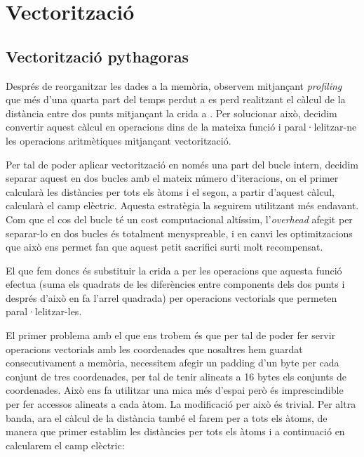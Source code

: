 
\section{Vectorització}

\subsection{Vectorització pythagoras}

Després de reorganitzar les dades a la memòria, observem mitjançant \emph{profiling} que més d'una quarta part del temps perdut a  es perd realitzant el càlcul de la distància entre dos punts mitjançant la crida a . Per solucionar això, decidim convertir aquest càlcul en operacions dins de la mateixa funció  i paral·lelitzar-ne les operacions aritmètiques mitjançant vectorització.

Per tal de poder aplicar vectorització en només una part del bucle intern, decidim separar aquest en dos bucles amb el mateix número d'iteracions, on el primer calcularà les distàncies per tots els àtoms i el segon, a partir d'aquest càlcul, calcularà el camp elèctric. Aquesta estratègia la seguirem utilitzant més endavant. Com que el cos del bucle té un cost computacional altíssim, l'\emph{overhead} afegit per separar-lo en dos bucles és totalment menyspreable, i en canvi les optimitzacions que això ens permet fan que aquest petit sacrifici surti molt recompensat.

El que fem doncs és substituir la crida a  per les operacions que aquesta funció efectua (suma els quadrats de les diferències entre components dels dos punts i després d'això en fa l'arrel quadrada) per operacions vectorials que permeten paral·lelitzar-les.

El primer problema amb el que ens trobem és que per tal de poder fer servir operacions vectorials amb les coordenades que nosaltres hem guardat consecutivament a memòria, necessitem afegir un padding d'un byte per cada conjunt de tres coordenades, per tal de tenir alineats a 16 bytes els conjunts de coordenades. Això ens fa utilitzar una mica més d'espai però és imprescindible per fer accessos alineats a cada àtom. La modificació per això és trivial. Per altra banda, ara el càlcul de la distància també el farem per a tots els àtoms, de manera que primer establim les distàncies per tots els àtoms i a continuació en calcularem el camp elèctric:


